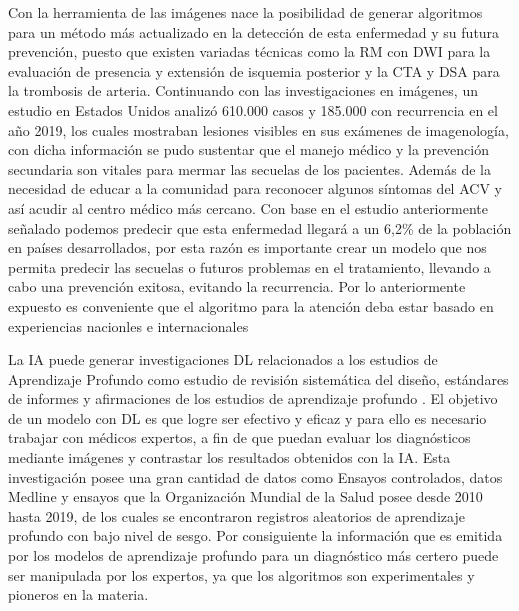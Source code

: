 \par Con la herramienta de las imágenes nace la posibilidad de generar algoritmos para un método más actualizado en la detección de esta enfermedad y su futura prevención, puesto que existen variadas técnicas \cite{Wintermark2013} como la RM con DWI para la evaluación de presencia y extensión de isquemia posterior y la CTA y DSA para la trombosis de arteria. Continuando  con las investigaciones en imágenes, un estudio en Estados Unidos \cite{Garcia2019}  analizó 610.000 casos y 185.000 con recurrencia en el año 2019,  los cuales mostraban lesiones visibles en sus exámenes de imagenología, con dicha información se pudo sustentar que el manejo médico y la prevención secundaria son vitales para mermar las secuelas de los pacientes. Además de la necesidad de educar a la comunidad para reconocer algunos síntomas del ACV y así acudir al centro médico más cercano. Con base en el estudio anteriormente señalado podemos predecir que esta enfermedad llegará a un 6,2\% de la población en  países desarrollados, por esta razón es importante crear un modelo que nos permita predecir las secuelas o futuros problemas en el tratamiento, llevando a cabo una prevención exitosa, evitando la recurrencia. Por lo anteriormente expuesto es conveniente que el algoritmo para la atención deba estar basado en experiencias nacionles e internacionales \cite{Garcia2019}\\

\par La IA puede generar investigaciones DL relacionados a los estudios de Aprendizaje Profundo como estudio de revisión sistemática del diseño, estándares de informes y afirmaciones de los estudios de aprendizaje profundo \cite{Pang2017}. El objetivo de un modelo con DL es que logre ser  efectivo y eficaz y para ello es necesario trabajar con médicos expertos, a fin de que puedan  evaluar los diagnósticos mediante imágenes y contrastar los resultados obtenidos con la IA. Esta investigación posee una gran cantidad de datos como Ensayos controlados, datos Medline y ensayos que la Organización Mundial de la Salud posee desde 2010 hasta 2019, de los cuales se encontraron registros aleatorios de aprendizaje profundo con bajo nivel de sesgo. Por consiguiente la información que es emitida por los modelos de aprendizaje profundo para un diagnóstico más certero puede ser manipulada por los expertos, ya que los algoritmos \cite{Nagendran2020} son experimentales y pioneros en la materia.\\

